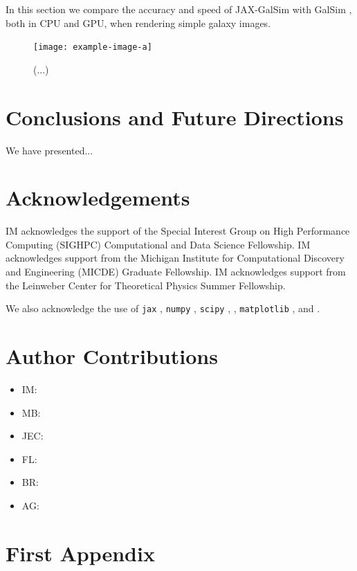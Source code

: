 \documentclass[twocolumn,twocolappendix]{openjournal}
\begin{document}
In this section we compare the accuracy and speed of JAX-GalSim with GalSim \citep{galsim2015}, both in CPU and GPU, when rendering simple galaxy images.

\begin{figure}
\texttt{[image: example-image-a]}
\caption{
    (...)
    }
\label{fig:benchmark1}
\end{figure}


\section{Conclusions and Future Directions}

We have presented...


\section*{Acknowledgements} 

IM acknowledges the support of the Special Interest Group on High Performance Computing (SIGHPC) Computational and Data Science Fellowship. IM acknowledges support from the Michigan Institute for Computational Discovery and Engineering (MICDE) Graduate Fellowship. IM acknowledges support from the Leinweber Center for Theoretical Physics Summer Fellowship.

We also acknowledge the use of \texttt{jax} \citep{jax2018github,frostig2018compiling}, \texttt{numpy} \citep{numpy2020}, \texttt{scipy} \citep{scipy2020}, \astropy \citep{astropy:2013,astropy:2018,astropy:2022}, \texttt{matplotlib} \citep{matplotlib2007}, and \galsim \citep{galsim2015}.


\section*{Author Contributions} 

\begin{itemize}
    \item IM: 

    \item MB: 

    \item JEC: 

    \item FL: 

    \item BR: 

    \item AG: 
\end{itemize}

\appendix
\section*{First Appendix}\label{app:first}

{}



\end{document}
